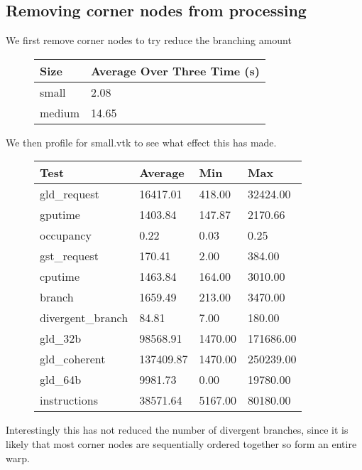 \subsection*{Removing corner nodes from processing}
We first remove corner nodes to try reduce the branching amount\\
\begin{figure}[H]\centering \begin{tabular}{ l | l }
  \hline
  Size & Average Over Three Time (s)\\
  \hline
  \hline
  small & 2.08 \\
  medium & 14.65 \\
  \hline
\end{tabular} \end{figure}

We then profile for small.vtk to see what effect this has made.\\
\begin{figure}[H]\centering \begin{tabular}{ l | l | l | l}
\hline
Test & Average & Min & Max \\
\hline
\hline
gld\_request & 16417.01 & 418.00 & 32424.00 \\
gputime & 1403.84 & 147.87 & 2170.66 \\
occupancy & 0.22 & 0.03 & 0.25 \\
gst\_request & 170.41 & 2.00 & 384.00 \\
cputime & 1463.84 & 164.00 & 3010.00 \\
branch & 1659.49 & 213.00 & 3470.00 \\
divergent\_branch & 84.81 & 7.00 & 180.00 \\
gld\_32b & 98568.91 & 1470.00 & 171686.00 \\
gld\_coherent & 137409.87 & 1470.00 & 250239.00 \\
gld\_64b & 9981.73 & 0.00 & 19780.00 \\
instructions & 38571.64 & 5167.00 & 80180.00 \\
\hline
\end{tabular} \end{figure}

Interestingly this has not reduced the number of divergent branches, since it is likely that most corner nodes are sequentially ordered together so form an entire warp.